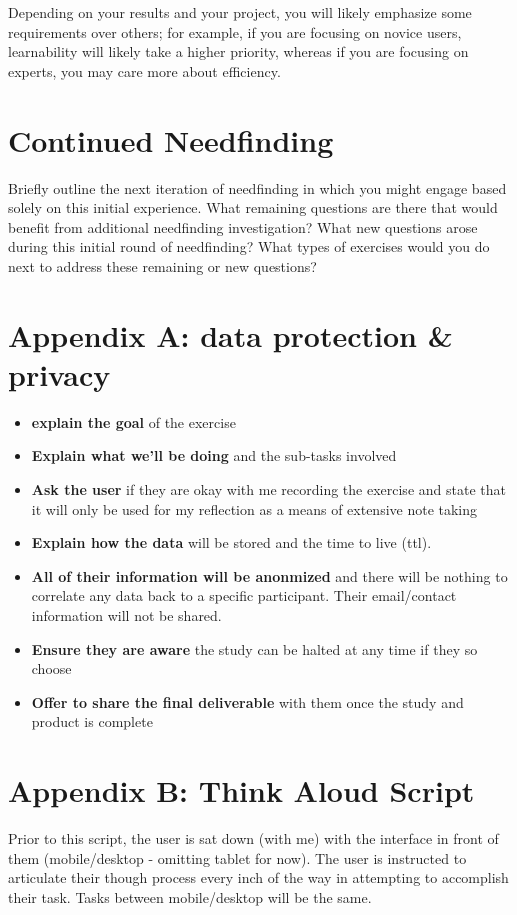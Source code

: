 Depending on your results and your project, you will likely emphasize some requirements over others; for example, if you are focusing on novice users, learnability will likely take a higher priority, whereas if you are focusing on experts, you may care more about efficiency.


\section{Continued Needfinding}
Briefly outline the next iteration of needfinding in which you might engage based solely on this initial experience. What remaining questions are there that would benefit from additional needfinding investigation? What new questions arose during this initial round of needfinding? What types of exercises would you do next to address these remaining or new questions?


\section{Appendix A: data protection & privacy}

\begin{itemize}
\item
  \textbf{explain the goal} of the exercise
\item
  \textbf{Explain what we'll be doing} and the sub-tasks involved
\item
  \textbf{Ask the user} if they are okay with me recording the exercise and state that it will only be used for my reflection as a means of extensive note taking
\item
  \textbf{Explain how the data} will be stored and the time to live (ttl).
\item
  \textbf{All of their information will be anonmized} and there will be nothing to correlate any data back to a specific participant. Their email/contact information will not be shared.
\item
  \textbf{Ensure they are aware} the study can be halted at any time if they so choose
\item
  \textbf{Offer to share the final deliverable} with them once the study and product is complete
\end{itemize}


\section{Appendix B: Think Aloud Script}
Prior to this script, the user is sat down (with me) with the interface in front of them (mobile/desktop - omitting tablet for now). The user is instructed to articulate their though process every inch of the way in attempting to accomplish their task. Tasks between mobile/desktop will be the same.

